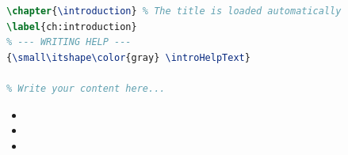 \begin{formulaBox}
    \small \helpStyle
\end{formulaBox}

\section{\guideHelpSystem}
\label{sec:guide_help_system}

\gdHelpIntro

\begin{lstlisting}[language=TeX, caption={\gdHelpListingCaption}, label={lst:chapter_structure}, frame=single]
\chapter{\introduction} % The title is loaded automatically
\label{ch:introduction}
% --- WRITING HELP ---
{\small\itshape\color{gray} \introHelpText}

% Write your content here...
\end{lstlisting}

\gdHelpSteps
\begin{itemize}
    \item \gdHelpStepOne
    \item \gdHelpStepTwo
    \item \gdHelpStepThree
\end{itemize}

\section{\gdCiteTitle}
\label{sec:guide_citations}

\gdCiteText

\section{\guideFigures}
\label{sec:guide_figures}
{\small\itshape\color{gray} \helpFigures}

